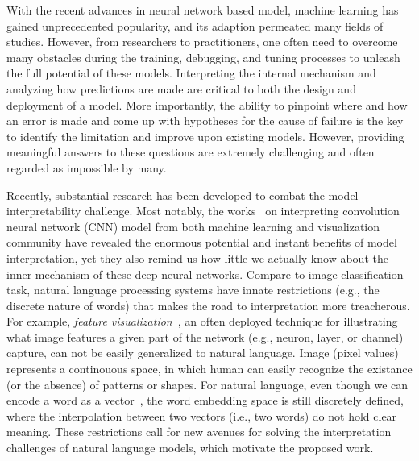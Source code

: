 \maketitle

With the recent advances in neural network based model, machine learning has gained unprecedented popularity, and its adaption permeated many fields of studies.
%
However, from researchers to practitioners, one often need to overcome many obstacles during the training, debugging, and tuning processes to unleash the full potential of these models.
%
Interpreting the internal mechanism and analyzing how predictions are made are critical to both the design and deployment of a model.
More importantly, the ability to pinpoint where and how an error is made and come up with hypotheses for the cause of failure is the key to identify the limitation and improve upon existing models.
However, providing meaningful answers to these questions are extremely challenging and often regarded as impossible by many.

Recently, substantial research has been developed to combat the model interpretability challenge. Most notably, the works~\cite{SimonyanVedaldiZisserman2013, ZeilerFergus2014, YosinskiCluneNguyen2015, OlahMordvintsevSchubert2017, LiuShiLi2017, OlahSatyanarayanJohnson2018, BilalJourablooYe2018} on interpreting convolution neural network (CNN) model from both machine learning and visualization community have revealed the enormous potential and instant benefits of model interpretation, yet they also remind us how little we actually know about the inner mechanism of these deep neural networks.
%
Compare to image classification task, natural language processing systems have innate restrictions (e.g., the discrete nature of words) that makes the road to interpretation more treacherous. For example, \emph{feature visualization}~\cite{OlahMordvintsevSchubert2017}, an often deployed technique for illustrating what image features a given part of the network (e.g., neuron, layer, or channel) capture, can not be easily generalized to natural language. Image (pixel values) represents a continouous space, in which human can easily recognize the existance (or the absence) of patterns or shapes. For natural language, even though we can encode a word as a vector~\cite{MikolovSutskeverChen2013, PenningtonSocherManning2014}, the word embedding space is still discretely defined, where the interpolation between two vectors (i.e., two words) do not hold clear meaning.
%
These restrictions call for new avenues for solving the interpretation challenges of natural language models, which motivate the proposed work.

